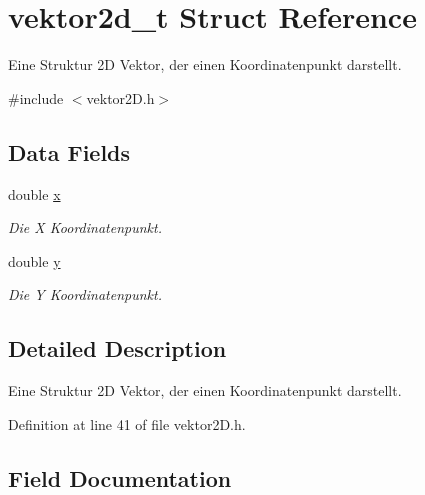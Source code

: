 \hypertarget{structvektor2d__t}{}\section{vektor2d\+\_\+t Struct Reference}
\label{structvektor2d__t}


Eine Struktur 2D Vektor, der einen Koordinatenpunkt darstellt.  




{\ttfamily \#include $<$vektor2\+D.\+h$>$}

\subsection*{Data Fields}
\begin{DoxyCompactItemize}
\item 
double \hyperlink{structvektor2d__t_abc6c2378cebc6d70131fe5ca1ff94050}{x}\hypertarget{structvektor2d__t_abc6c2378cebc6d70131fe5ca1ff94050}{}\label{structvektor2d__t_abc6c2378cebc6d70131fe5ca1ff94050}

\begin{DoxyCompactList}\small\item\em Die X Koordinatenpunkt. \end{DoxyCompactList}\item 
double \hyperlink{structvektor2d__t_a3c83744cd0477a439f4cd2385f702579}{y}\hypertarget{structvektor2d__t_a3c83744cd0477a439f4cd2385f702579}{}\label{structvektor2d__t_a3c83744cd0477a439f4cd2385f702579}

\begin{DoxyCompactList}\small\item\em Die Y Koordinatenpunkt. \end{DoxyCompactList}\end{DoxyCompactItemize}


\subsection{Detailed Description}
Eine Struktur 2D Vektor, der einen Koordinatenpunkt darstellt. 

Definition at line 41 of file vektor2\+D.\+h.



\subsection{Field Documentation}
